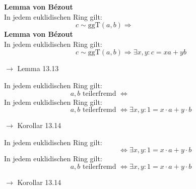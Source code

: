 \documentclass[11pt]{article}
\renewcommand{\cite}[1]{\par\bigskip\hfill{\color{gray}\tiny\(\to\) #1}}
\newenvironment{field}{}{\newpage}
\newif\ifnote
\newenvironment{note}{\notetrue}{\notefalse}
\newcommand{\localtag}{}
\newcommand{\globaltag}{}
\newcommand{\uuid}{}
\newcommand{\tags}[1]{
    \ifnote
        \renewcommand{\localtag}{#1}
    \else
        \renewcommand{\globaltag}{#1}
    \fi
    }
\newcommand{\xplain}[1]{\renewcommand{\uuid}{#1}}
\begin{document}
\begin{note}
    \tags{Satz}
    \xplain{f84dc2fc-8eb1-4c7b-a9f5-aafbb11fc382}

    \begin{field}
        \textbf{Lemma von Bézout}\\
        In jedem euklidischen Ring gilt:
        \[c \sim \text{ggT}(a,b) \Rightarrow \phantom{\exists x,y\colon c = xa + yb}\]
    \end{field}
    \begin{field}
        \textbf{Lemma von Bézout}\\
        In jedem euklidischen Ring gilt:
        \[c \sim \text{ggT}(a,b) \Rightarrow  \exists x,y \colon c = xa + yb\]
        \cite{Lemma 13.13}
    \end{field}

    \begin{field}
        In jedem euklidischen Ring gilt:
        \[a, b \text{ teilerfremd } \Leftrightarrow \phantom{\exists x,y\colon 1=x\cdot a + y\cdot b}\]
    \end{field}
    \begin{field}
        In jedem euklidischen Ring gilt:
        \[a, b \text{ teilerfremd } \Leftrightarrow \exists x,y\colon 1=x\cdot a + y\cdot b\]
        \cite{Korollar 13.14}
    \end{field}

    \begin{field}
        In jedem euklidischen Ring gilt:
        \[\phantom{a, b \text{ teilerfremd }} \Leftrightarrow \exists x,y\colon 1=x\cdot a + y\cdot b\]
    \end{field}
    \begin{field}
        In jedem euklidischen Ring gilt:
        \[a, b \text{ teilerfremd } \Leftrightarrow \exists x,y\colon 1=x\cdot a + y\cdot b\]
        \cite{Korollar 13.14}
    \end{field}
\end{note}
\end{document}
